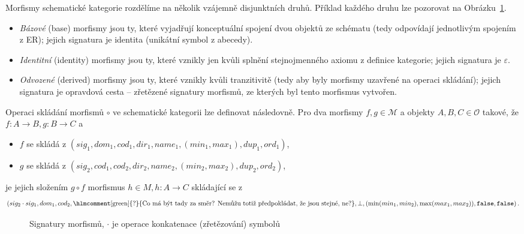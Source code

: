 Morfismy schematické kategorie rozdělíme na několik vzájemně disjunktních druhů.
Příklad každého druhu lze pozorovat na Obrázku~\ref{fig:morphism-signatures}.
\begin{itemize}
  \item \emph{Bázové} (base) morfismy jsou ty, které vyjadřují konceptuální spojení dvou objektů ze schématu (tedy odpovídají jednotlivým spojením z ER); jejich signatura je identita (unikátní symbol z abecedy).
  \item \emph{Identitní} (identity) morfismy jsou ty, které vznikly jen kvůli splnění stejnojmenného axiomu z definice kategorie; jejich signatura je $\varepsilon$.
  \item \emph{Odvozené} (derived) morfismy jsou ty, které vznikly kvůli tranzitivitě (tedy aby byly morfismy uzavřené na operaci skládání); jejich signatura je opravdová cesta -- zřetězené signatury morfismů, ze kterých byl tento morfismus vytvořen.
\end{itemize}

Operaci skládání morfismů $\circ$ ve schematické kategorii lze definovat následovně.
Pro dva morfismy $f,g\in\mathcal M$ a objekty $A,B,C\in \mathcal O$ takové, že $f\colon A\to B, g\colon B\to C$ a
\begin{itemize}
  \item $f$ se skládá z $(sig_1, dom_1, cod_1, dir_1, name_1, (min_1, max_1), dup_1, ord_1)$,
  \item $g$ se skládá z $(sig_2, cod_1, cod_2, dir_2, name_2, (min_2, max_2), dup_2, ord_2)$,
\end{itemize}
je jejich složením $g\circ f$ morfismus $h\in M, h\colon A\to C$ skládající se z
$$(sig_2\cdot sig_1, dom_1, cod_2, \text{\hlmcomment[green]{?}{Co má být tady za směr? Nemůžu totiž předpokládat, že jsou stejné, ne?}}, \bot, (\min(min_1, min_2), \max(max_1, max_2)), \mathtt{false}, \mathtt{false})\,.$$

\begin{figure}[!htb]
  \centering
  \caption{Signatury morfismů, $\cdot$ je operace konkatenace (zřetězování) symbolů}
  \label{fig:morphism-signatures}
\end{figure}

